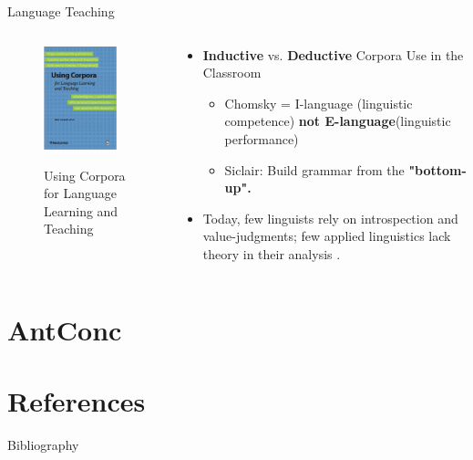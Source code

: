 \documentclass{beamer}
\begin{document}
\begin{frame}{Language Teaching}
	\begin{columns}
		\begin{column}{4cm}
			\begin{figure}
				\includegraphics[height=3cm]{lei.jpg}
					\begin{center}
						\begin{tiny}
						Using Corpora for Language Learning and Teaching\\
						\cite{liu_using_2017}
						\end{tiny}
					\end{center}
			\end{figure}
		\end{column}
		
        \begin{column}{6cm}
		\begin{itemize}
\item \textbf{Inductive} vs. \textbf{Deductive} Corpora Use in the Classroom
\begin{itemize}
\item Chomsky = I-language (linguistic competence) \textbf{not E-language}(linguistic performance)
\item Siclair: Build grammar from the \textbf{"bottom-up".}
\end{itemize}
\item Today, few linguists rely on introspection and value-judgments; few applied linguistics lack theory in their analysis	.
\end{itemize}
\end{column}
\end{columns}
\end{frame}



\section{AntConc}
	
\section{References}

\begin{frame}[fragile]{Bibliography}




\end{frame}
\end{document}
